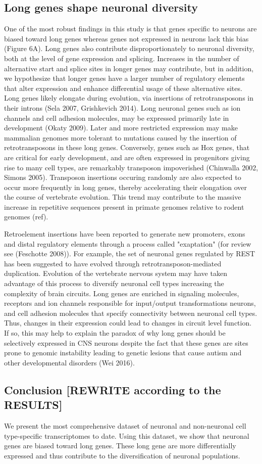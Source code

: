 \subsection{Long genes shape neuronal diversity}
One of the most robust findings in this study is that genes specific to neurons are biased toward long genes whereas genes not expressed in neurons lack this bias (Figure 6A). Long genes also contribute disproportionately to neuronal diversity, both at the level of gene expression and splicing. Increases in the number of alternative start and splice sites in longer genes may contribute, but in addition, we hypothesize that longer genes have a larger number of regulatory elements that alter expression and enhance differential usage of these alternative sites. Long genes likely elongate during evolution, via insertions of retrotransposons in their introns (Sela 2007, Grishkevich 2014). Long neuronal genes such as ion channels and cell adhesion molecules, may be expressed primarily late in development (Okaty 2009). Later and more restricted expression may make mammalian genomes more tolerant to mutations caused by the insertion of retrotransposons in these long genes. Conversely, genes such as Hox genes, that are critical for early development, and are often expressed in progenitors giving rise to many cell types, are remarkably transposon impoverished (Chinwalla 2002, Simons 2005). Transposon insertions occuring randomly are also expected to occur more frequently in long genes, thereby accelerating their elongation over the course of vertebrate evolution. This trend may contribute to the massive increase in repetitive sequences present in primate genomes relative to rodent genomes (ref).

Retroelement insertions have been reported to generate new promoters, exons and distal regulatory elements through a process called "exaptation" (for review see (Feschotte 2008)). For example, the set of neuronal genes regulated by REST has been suggested to have evolved through retrotransposon-mediated duplication\cite{Johnson_2006}.  Evolution of the vertebrate nervous system may have taken advantage of this process to diversify neuronal cell types increasing the complexity of brain circuits. Long genes are enriched in signaling molecules, receptors and ion channels responsible for input/output transformations neurons, and cell adhesion molecules that specify connectivity between neuronal cell types. Thus, changes in their expression could lead to changes in circuit level function. If so, this may help to explain the paradox of why long genes should be selectively expressed in CNS neurons despite the fact that these genes are sites prone to genomic instability leading to genetic lesions that cause autism and other developmental disorders (Wei 2016).

\subsection{Conclusion [REWRITE according to the RESULTS]}
We present the most comprehensive dataset of neuronal and non-neuronal cell type-specific transcriptomes to date. Using this dataset, we show that neuronal genes are biased toward long genes. These long gene are more differentially expressed and thus contribute to the diversification of neuronal populations.
